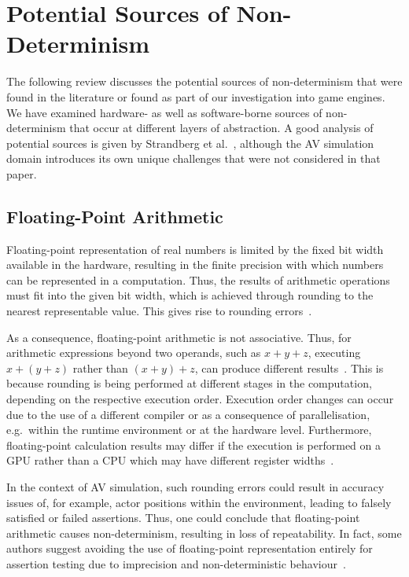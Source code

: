 \section{Potential Sources of Non-Determinism} \label{s:nondeterminisimSources}

The following review discusses the potential sources of non-determinism that were found in the literature or found as part of our investigation into game engines. We have examined hardware- as well as software-borne sources of non-determinism that occur at different layers of abstraction. 
%
A good analysis of potential sources is given by Strandberg et al.~\cite{intermittently-failing-tests}, although the AV simulation domain introduces its own unique challenges that were not considered in that paper.

\medskip

\subsection{Floating-Point Arithmetic}

Floating-point representation of real numbers is limited by the fixed bit width available in the hardware, resulting in the finite precision with which numbers can be represented in a computation. 
Thus, the results of arithmetic operations must fit into the given bit width, which is achieved through rounding to the nearest representable value. This gives rise to rounding errors~\cite{FloatingPointsBook,goldberg1991every}. %

As a consequence, floating-point arithmetic is not associative. Thus, for arithmetic expressions beyond two operands, such as $x+y+z$, executing $x+(y+z)$ rather than $(x+y)+z$, can produce different results~\cite{Kapre2007}. This is because rounding is being performed at different stages in the computation, depending on the respective execution order. 
%
Execution order changes can occur due to the use of a different compiler or as a consequence of parallelisation, e.g.\ within the runtime environment or at the hardware level. 
%
Furthermore, floating-point calculation results may differ if the execution is performed on a GPU rather than a CPU which may have different register widths~\cite{Whitehead2011}. 

In the context of AV simulation, such rounding errors could result in accuracy issues of, for example, actor positions within the environment, leading to falsely satisfied or failed assertions.
%
Thus, one could conclude that floating-point arithmetic causes non-determinism, resulting in loss of repeatability. In fact, some authors suggest avoiding the use of floating-point representation entirely for assertion testing due to imprecision and non-deterministic behaviour~\cite{empirical-analysis-of-flaky-tests}. 

